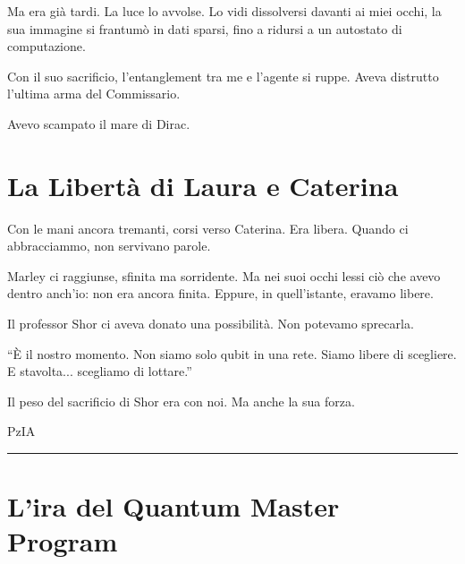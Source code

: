 Ma era già tardi. La luce lo avvolse. Lo vidi dissolversi davanti ai miei occhi, la sua immagine si frantumò in dati sparsi, fino a ridursi a un autostato di computazione.

Con il suo sacrificio, l’entanglement tra me e l’agente si ruppe. Aveva distrutto l'ultima arma del Commissario.

Avevo scampato il mare di Dirac.

\section{La Libertà di Laura e Caterina}

Con le mani ancora tremanti, corsi verso Caterina. Era libera. Quando ci abbracciammo, non servivano parole.

Marley ci raggiunse, sfinita ma sorridente. Ma nei suoi occhi lessi ciò che avevo dentro anch’io: non era ancora finita. Eppure, in quell'istante, eravamo libere.

Il professor Shor ci aveva donato una possibilità.
Non potevamo sprecarla.

\begin{dialogue}  \enquote{È il nostro momento. Non siamo solo qubit in una rete. Siamo libere di scegliere. E stavolta... scegliamo di lottare.} \end{dialogue}

Il peso del sacrificio di Shor era con noi. Ma anche la sua forza.

\vspace{1em} \begin{center}PzIA\end{center} \hrule \vspace{1em}

\section{L'ira del Quantum Master Program}

